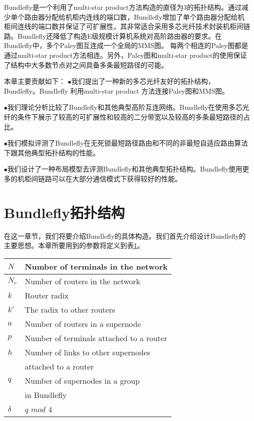   Bundlefly是一个利用了multi-star product方法构造的直径为3的拓扑结构。通过减少单个路由器分配给机柜内连线的端口数，Bundlefly增加了单个路由器分配给机柜间连线的端口数并保证了可扩展性，其非常适合采用多芯光纤技术封装机柜间链路。Bundlefly还降低了构造E级规模计算机系统对高阶路由器的要求。在Bundlefly中，多个Paley图互连成一个全局的MMS图。 每两个相连的Paley图都是通过multi-star product方法相连。另外，Paley图和multi-star product的使用保证了结构中大多数节点对之间具备多条最短路径的可能。

  本章主要贡献如下：
  $\bullet$我们提出了一种新的多芯光纤友好的拓扑结构，Bundlefly。Bundlefly 利用multi-star product 方法连接Paley图和MMS图。

  $\bullet$我们理论分析比较了Bundlefly和其他典型高阶互连网络。Bundlefly在使用多芯光纤的条件下展示了较高的可扩展性和较高的二分带宽以及较高的多条最短路径的占比。

   $\bullet$我们模拟评测了Bundlefly在无死锁最短路径路由和不同的非最短自适应路由算法下跟其他典型拓扑结构的性能。

   $\bullet$我们设计了一种布局模型去评测Bundlefly和其他典型拓扑结构。Bundlefly使用更多的机柜间链路可以在大部分通信模式下获得较好的性能。

\section{Bundlefly拓扑结构}

在这一章节，我们将要介绍Bundlefly的具体构造。我们首先介绍设计Bundlefly的主要思想。本章所要用到的参数将定义到表\ref{Table1}。

\begin{table}[t]
\centering
  \vspace{-.3cm}
\begin{tabular}{l l}\hline
  \centering
  $N$ & Number of terminals in the network\\\hline
  $N_r$ & Number of routers in the network\\\hline
  $k$ & Router radix\\\hline
  $k'$ & The radix to other routers\\\hline
  $a$	& Number of routers in a supernode\\\hline
  $p$	& Number of terminals attached to a router\\\hline
  $h$	& Number of links to other supernodes\\
        & attached to a router\\\hline
  $q$	& Number of supernodes in a group \\
        & in Bundlefly\\\hline
  $\delta$ & $q$ $mod$ $4$\\\hline
\end{tabular}
   \label{Table1}
   \end{table}

